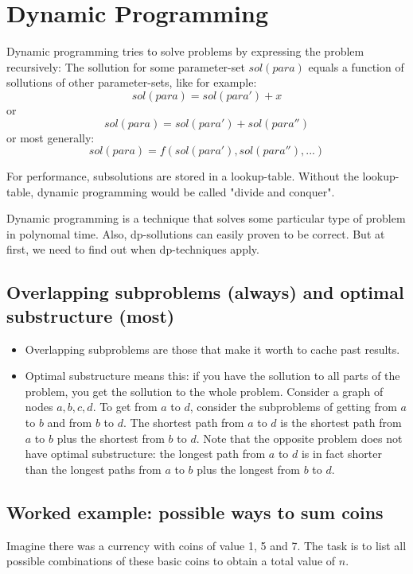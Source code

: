 \section{Dynamic Programming}

Dynamic programming tries to solve problems by expressing the problem recursively: The sollution for some parameter-set $sol(para)$ equals a function of sollutions of other parameter-sets, like for example: 
$$ sol(para) = sol(para') + x$$
or
$$ sol(para) = sol(para') + sol(para'')$$
or most generally:
$$ sol(para) = f(sol(para'), sol(para''), ...)$$

For performance, subsolutions are stored in a lookup-table. Without the lookup-table, dynamic programming would be called "divide and conquer".


Dynamic programming is a technique that solves some particular type of problem in polynomal time. Also, dp-sollutions can easily proven to be correct. But at first, we need to find out when dp-techniques apply. 

\subsection{Overlapping subproblems (always) and optimal substructure (most)}
\begin{itemize}
	\item Overlapping subproblems are those that make it worth to cache past results.
	\item Optimal substructure means this: if you have the sollution to all parts of the problem, you get the sollution to the whole problem. Consider a graph of nodes $a, b, c, d$. To get from $a$ to $d$, consider the subproblems of getting from $a$ to $b$ and from $b$ to $d$. The shortest path from $a$ to $d$ is the shortest path from $a$ to $b$ plus the shortest from $b$ to $d$. Note that the opposite problem does not have optimal substructure: the longest path from $a$ to $d$ is in fact shorter than the longest paths from $a$ to $b$ plus the longest  from $b$ to $d$.
\end{itemize}

\subsection{Worked example: possible ways to sum coins}
Imagine there was a currency with coins of value 1, 5 and 7. The task is to list all possible combinations of these basic coins to obtain a total value of $n$.



